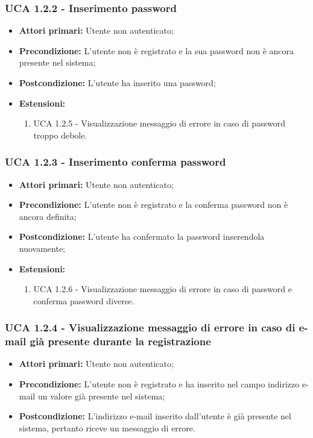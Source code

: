 \subsubsection{UCA 1.2.2 - Inserimento password}%
\begin{itemize}
\item \textbf{Attori primari:} Utente non autenticato;
\item \textbf{Precondizione:} L'utente non è registrato e la sua password non è ancora presente nel sistema;
\item \textbf{Postcondizione:} L'utente ha inserito una password;
\item \textbf{Estensioni:}
	\begin{enumerate}
		\item UCA 1.2.5 - Visualizzazione messaggio di errore in caso di password troppo debole.
	\end{enumerate}
\end{itemize}

\subsubsection{UCA 1.2.3 - Inserimento conferma password}%
\begin{itemize}
\item \textbf{Attori primari:} Utente non autenticato;
\item \textbf{Precondizione:} L'utente non è registrato e la conferma password non è ancora definita;
\item \textbf{Postcondizione:} L'utente ha confermato la password inserendola nuovamente;
\item \textbf{Estensioni:}
	\begin{enumerate}
		\item UCA 1.2.6 - Visualizzazione messaggio di errore in caso di password e conferma password diverse.
	\end{enumerate}
\end{itemize}

\subsubsection{UCA 1.2.4 - Visualizzazione messaggio di errore in caso di e-mail già presente durante la registrazione}%
\begin{itemize}
\item \textbf{Attori primari:} Utente non autenticato;
\item \textbf{Precondizione:} L'utente non è registrato e ha inserito nel campo indirizzo e-mail un valore già presente nel sistema;
\item \textbf{Postcondizione:} L'indirizzo e-mail inserito dall'utente è già presente nel sistema, pertanto riceve un messaggio di errore.
\end{itemize}


